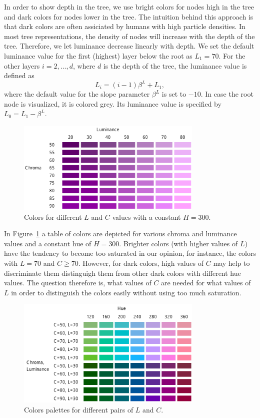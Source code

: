 \documentclass[journal]{vgtc}                %
\begin{document}
In order to show depth in the tree, we use bright colors for nodes high in the tree and dark colors for nodes lower in the tree. The intuition behind this approach is that dark colors are often assiciated by humans with high particle densities. In most tree representations, the density of nodes will increase with the depth of the tree. Therefore, we let luminance decrease linearly with depth.  We set the default luminance value for the first (highest) layer below the root as $L_1=70$. For the other layers $i=2,\ldots, d$, where $d$ is the depth of the tree, the luminance value is defined as
\begin{equation}
L_i=(i-1)\beta^L + L_1,
\end{equation}
where the default value for the slope parameter $\beta^L$ is set to $-10$. In case the root node is visualized, it is colored grey. Its luminance value is specified by $L_0=L_1-\beta^L$.

\begin{figure}[htb]
  \centering
  \includegraphics[width=3.5in]{LC.pdf}
  \caption{Colors for different $L$ and $C$ values with a constant $H=300$.}\label{fig:lc}
\end{figure}

In Figure~\ref{fig:lc} a table of colors are depicted for various chroma and luminance values and a constant hue of $H=300$. Brighter colors (with higher values of $L$) have the tendency to become too saturated in our opinion, for instance, the colors with $L=70$ and $C\geq70$. However, for dark colors, high values of $C$ may help to discriminate them distinguigh them from other dark colors with different hue values. The question therefore is, what values of $C$ are needed for what values of $L$ in order to distinguish the colors easily without using too much saturation.


\begin{figure}[htb]
  \centering
  \includegraphics[width=3.5in]{LC2.pdf}
  \caption{Colors palettes for different pairs of $L$ and $C$.}\label{fig:lc2}
\end{figure}
\end{document}
